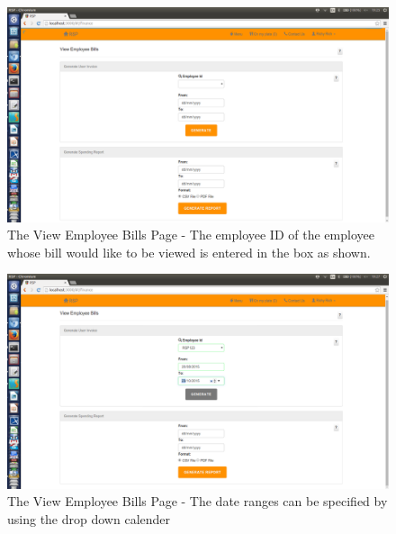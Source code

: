 \documentclass[a4paper,12pt]{report}
\begin{document}
\begin{figure}[H]
  \centering
    \includegraphics[width=1.0\textwidth]{screenshots/bill1.png}
    \caption{The View Employee Bills Page - The employee ID of the employee whose bill would like to be viewed is entered in the box as shown.}
\end{figure}

\begin{figure}[H]
  \centering
    \includegraphics[width=1.0\textwidth]{screenshots/bill2.png}
    \caption{The View Employee Bills Page - The date ranges can be specified by using the drop down calender}
\end{figure}
\end{document}
